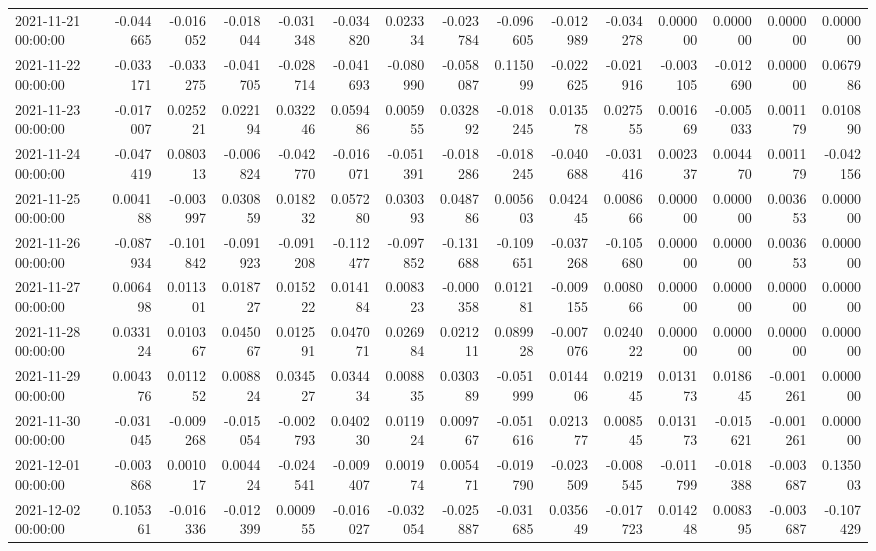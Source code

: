 \begin{tabular}{lrrrrrrrrrrrrrr}
2021-11-21 00:00:00 & -0.044665 & -0.016052 & -0.018044 & -0.031348 & -0.034820 & 0.023334 & -0.023784 & -0.096605 & -0.012989 & -0.034278 & 0.000000 & 0.000000 & 0.000000 & 0.000000 \\
2021-11-22 00:00:00 & -0.033171 & -0.033275 & -0.041705 & -0.028714 & -0.041693 & -0.080990 & -0.058087 & 0.115099 & -0.022625 & -0.021916 & -0.003105 & -0.012690 & 0.000000 & 0.067986 \\
2021-11-23 00:00:00 & -0.017007 & 0.025221 & 0.022194 & 0.032246 & 0.059486 & 0.005955 & 0.032892 & -0.018245 & 0.013578 & 0.027555 & 0.001669 & -0.005033 & 0.001179 & 0.010890 \\
2021-11-24 00:00:00 & -0.047419 & 0.080313 & -0.006824 & -0.042770 & -0.016071 & -0.051391 & -0.018286 & -0.018245 & -0.040688 & -0.031416 & 0.002337 & 0.004470 & 0.001179 & -0.042156 \\
2021-11-25 00:00:00 & 0.004188 & -0.003997 & 0.030859 & 0.018232 & 0.057280 & 0.030393 & 0.048786 & 0.005603 & 0.042445 & 0.008666 & 0.000000 & 0.000000 & 0.003653 & 0.000000 \\
2021-11-26 00:00:00 & -0.087934 & -0.101842 & -0.091923 & -0.091208 & -0.112477 & -0.097852 & -0.131688 & -0.109651 & -0.037268 & -0.105680 & 0.000000 & 0.000000 & 0.003653 & 0.000000 \\
2021-11-27 00:00:00 & 0.006498 & 0.011301 & 0.018727 & 0.015222 & 0.014184 & 0.008323 & -0.000358 & 0.012181 & -0.009155 & 0.008066 & 0.000000 & 0.000000 & 0.000000 & 0.000000 \\
2021-11-28 00:00:00 & 0.033124 & 0.010367 & 0.045067 & 0.012591 & 0.047071 & 0.026984 & 0.021211 & 0.089928 & -0.007076 & 0.024022 & 0.000000 & 0.000000 & 0.000000 & 0.000000 \\
2021-11-29 00:00:00 & 0.004376 & 0.011252 & 0.008824 & 0.034527 & 0.034434 & 0.008835 & 0.030389 & -0.051999 & 0.014406 & 0.021945 & 0.013173 & 0.018645 & -0.001261 & 0.000000 \\
2021-11-30 00:00:00 & -0.031045 & -0.009268 & -0.015054 & -0.002793 & 0.040230 & 0.011924 & 0.009767 & -0.051616 & 0.021377 & 0.008545 & 0.013173 & -0.015621 & -0.001261 & 0.000000 \\
2021-12-01 00:00:00 & -0.003868 & 0.001017 & 0.004424 & -0.024541 & -0.009407 & 0.001974 & 0.005471 & -0.019790 & -0.023509 & -0.008545 & -0.011799 & -0.018388 & -0.003687 & 0.135003 \\
2021-12-02 00:00:00 & 0.105361 & -0.016336 & -0.012399 & 0.000955 & -0.016027 & -0.032054 & -0.025887 & -0.031685 & 0.035649 & -0.017723 & 0.014248 & 0.008395 & -0.003687 & -0.107429 \\

\end{tabular}
